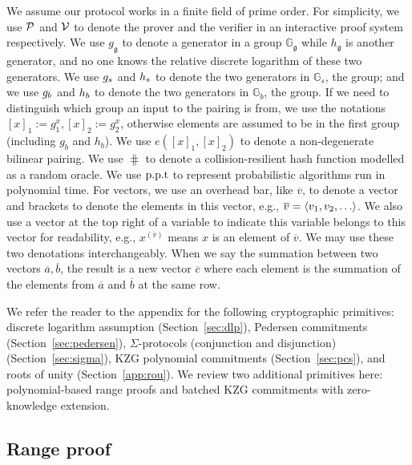 We assume our protocol works in a finite field of prime order. For simplicity, we use $\mathcal{P}$ and $\mathcal{V}$ to denote the prover and the verifier in an interactive proof system respectively. We use $g_\mathfrak{g}$ to denote a generator in a group $\mathbb{G}_\mathfrak{g}$ while $h_\mathfrak{g}$ is another generator, and no one knows the relative discrete logarithm of these two generators. We use $g_s$ and $h_s$ to denote the two generators in $\mathbb{G}_s$, the \secp group; and we use $g_b$ and $h_b$ to denote the two generators in $\mathbb{G}_b$, the \bls group. If we need to distinguish which group an input to the pairing is from, we use the notations $[x]_1:=g_1^x,[x]_2:=g_2^x$, otherwise elements are  assumed to be in the first group (including $g_b$ and $h_b$). We use $e([x]_1,[x]_2)$ to denote a non-degenerate bilinear pairing. We use $\hash$ to denote a collision-resilient hash function modelled as a random oracle. We use $\text{p.p.t}$ to represent probabilistic algorithms run in polynomial time.  For vectors, we use an overhead bar, like $\overline{v}$, to denote a vector and brackets to denote the elements in this vector, e.g., $\overline{v}=\tuple{v_1,v_2,\dots}$. We also use a vector at the top right of a variable to indicate this variable belongs to this vector for readability, e.g., $x^{(\overline{v})}$ means $x$ is an element of $\overline{v}$. We may use these two denotations interchangeably. When we say the summation between two vectors $\overline{a},\overline{b}$, the result is a new vector $\overline{c}$ where each element is the summation of the elements from $\overline{a}$ and $\overline{b}$ at the same row.

We refer the reader to the appendix for the following cryptographic primitives: discrete logarithm assumption (Section~\ref{sec:dlp}), Pedersen commitments (Section~\ref{sec:pedersen}), $\Sigma$-protocols (conjunction and disjunction) (Section~\ref{sec:sigma}), KZG polynomial commitments (Section~\ref{sec:pcs}), and roots of unity (Section~\ref{app:rou}). We review two additional primitives here: polynomial-based range proofs and batched KZG commitments with zero-knowledge extension.

\subsection{Range proof}
\label{sec:range}

